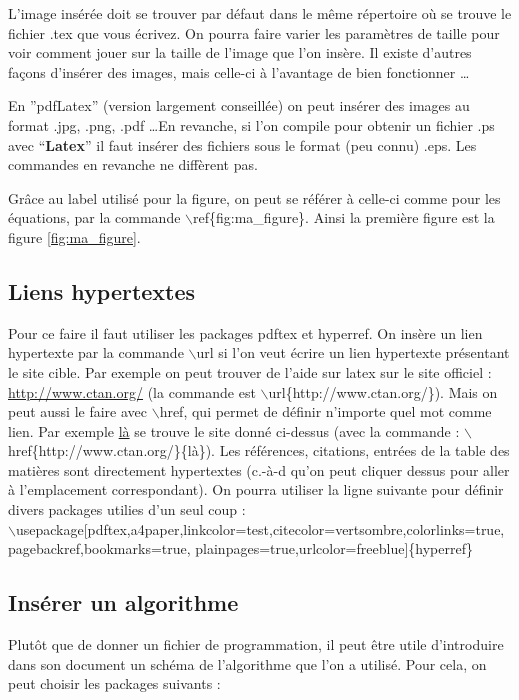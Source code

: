 \documentclass[11pt]{article}
\theoremstyle{remark}
\theoremstyle{definition}
\begin{document}
L'image insérée doit se trouver par défaut dans le même répertoire où se trouve le fichier .tex que vous écrivez. On pourra faire varier les paramètres de taille pour voir comment jouer sur la taille de l'image que l'on insère. Il existe d'autres façons d'insérer des images, mais celle-ci à l'avantage de bien fonctionner \ldots \medskip


En ''pdfLatex'' (version largement conseillée)  on peut insérer des images au format .jpg, .png, .pdf \ldots En revanche, si l'on compile pour obtenir un fichier .ps avec ``\textbf{Latex}'' il faut insérer des fichiers sous le format (peu connu) .eps. Les commandes en revanche ne diffèrent pas.\medskip

Grâce au label utilisé pour la figure, on peut se référer  à celle-ci comme pour les équations, par la commande $\backslash$ref\{fig:ma\_figure\}.
Ainsi la première figure est la figure \ref{fig:ma_figure}.

\subsection{Liens hypertextes}

Pour ce faire il faut utiliser les packages pdftex et hyperref.
On insère un lien hypertexte par la commande $\backslash$url si l'on veut écrire un lien hypertexte présentant le site cible. Par exemple on peut trouver de l'aide sur latex sur le site officiel : \url{http://www.ctan.org/} (la commande est $\backslash $url\{http://www.ctan.org/\}). Mais on peut aussi le faire avec $\backslash$href, qui permet de définir n'importe quel mot comme lien. Par exemple \href{http://www.ctan.org/}{là} se trouve le site donné ci-dessus (avec la commande : $\backslash$href\{http://www.ctan.org/\}\{là\}).  Les références, citations, entrées de la table des matières sont directement hypertextes (c.-à-d qu'on peut cliquer dessus pour aller à l'emplacement correspondant).
On pourra utiliser la ligne suivante pour définir divers packages utilies  d'un seul coup :\\
$\backslash$usepackage[pdftex,a4paper,linkcolor=test,citecolor=vertsombre,colorlinks=true,\\pagebackref,bookmarks=true, plainpages=true,urlcolor=freeblue]\{hyperref\}


\subsection{Insérer un algorithme}
Plutôt que de donner un fichier de programmation, il peut être utile d'introduire dans son document un schéma de l'algorithme que l'on a utilisé. Pour cela, on peut choisir les packages suivants :\medskip
\end{document}
